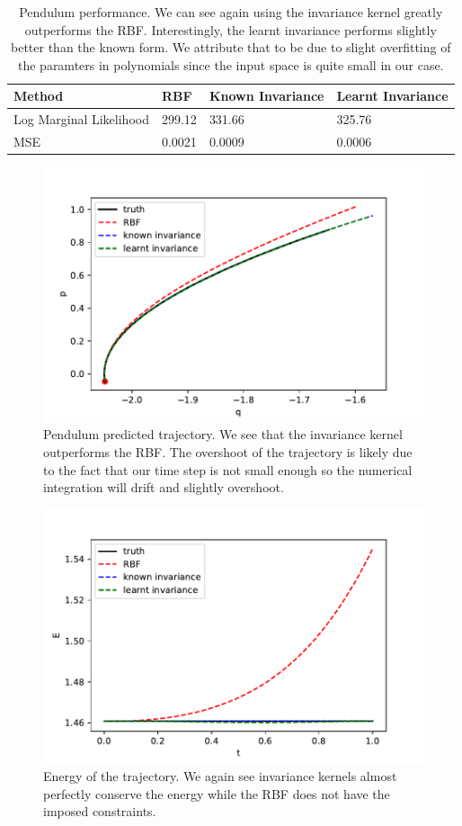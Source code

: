 \documentclass{statsmsc}
\begin{document}
\begin{table}[H]
  \centering
  \begin{tabular}{ l l l l}
    \hline
Method           & RBF & Known Invariance&  Learnt Invariance\\
                    \hline
Log Marginal Likelihood & 299.12 & 331.66 & 325.76 \\
MSE & 0.0021 & 0.0009 & 0.0006 \\
    \hline
  \end{tabular}
  \caption{Pendulum performance. We can see again using the invariance kernel greatly outperforms the RBF. Interestingly, the learnt invariance performs slightly better than the known form. We attribute that to be due to slight overfitting of the paramters in polynomials since the input space is quite small in our case.}
  \label{tab:pendulum_performance}
\end{table}

\begin{figure}[H]
        \centering
        \includegraphics[width=0.8\linewidth]{../codes/figures/pendulum_predicted.pdf}
        \caption{Pendulum predicted trajectory. We see that the invariance kernel outperforms the RBF. The overshoot of the trajectory is likely due to the fact that our time step is not small enough so the numerical integration will drift and slightly overshoot.}
        \label{fig:pendulum_prediction}
\end{figure}

\begin{figure}[H] 
  \includegraphics[width=0.8\linewidth]{../codes/figures/pendulum_energy.pdf}
  \centering
  \caption{Energy of the trajectory. We again see invariance kernels almost perfectly conserve the energy while the RBF does not have the imposed constraints.}
  \label{fig:pendulum_energy}
\end{figure}
\end{document}
